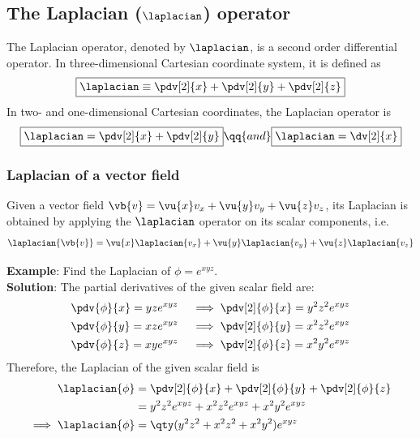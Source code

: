 	\subsection{The Laplacian ($\laplacian$) operator}
		The Laplacian operator, denoted by $\laplacian$, is a second order differential operator. In three-dimensional Cartesian coordinate system, it is defined as
		\begin{align*}
			\boxed{\laplacian\equiv\pdv[2]{x}+\pdv[2]{y}+\pdv[2]{z}}
		\end{align*}
		In two- and one-dimensional Cartesian coordinates, the Laplacian operator is
		\begin{align*}
			\boxed{\laplacian=\pdv[2]{x}+\pdv[2]{y}}\qq{and}\boxed{\laplacian=\dv[2]{x}}
		\end{align*}
		
			
		\subsubsection{Laplacian of a vector field}
			Given a vector field $\vb{v}=\vu{x}v_x+\vu{y}v_y+\vu{z}v_z$, its Laplacian is obtained by applying the $\laplacian$ operator on its scalar components, i.e.
			\begin{align*}
				\laplacian{\vb{v}}=\vu{x}\laplacian{v_x}+\vu{y}\laplacian{v_y}+\vu{z}\laplacian{v_z}
			\end{align*}
			
		\textbf{Example}: Find the Laplacian of $\phi=e^{xyz}$.\\
		\textbf{Solution}: The partial derivatives of the given scalar field are:
		\begin{align*}
			\pdv{\phi}{x}=yze^{xyz}\quad&\implies\pdv[2]{\phi}{x}=y^2z^2e^{xyz} \\
			\pdv{\phi}{y}=xze^{xyz}\quad&\implies\pdv[2]{\phi}{y}=x^2z^2e^{xyz} \\
			\pdv{\phi}{z}=xye^{xyz}\quad&\implies\pdv[2]{\phi}{z}=x^2y^2e^{xyz}
		\end{align*}
		Therefore, the Laplacian of the given scalar field is
		\begin{align*}
			\laplacian{\phi}&=\pdv[2]{\phi}{x}+\pdv[2]{\phi}{y}+\pdv[2]{\phi}{z} \\
				&=y^2z^2e^{xyz}+x^2z^2e^{xyz}+x^2y^2e^{xyz} \\
			\implies\laplacian{\phi}&=\qty(y^2z^2+x^2z^2+x^2y^2)e^{xyz}
		\end{align*}
	
